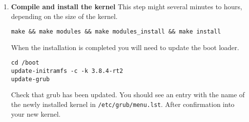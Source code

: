 \begin{enumerate}
\item \textbf{Compile and install the kernel} This step might several minutes to hours, depending on the size of the kernel.
\begin{lstlisting}
make && make modules && make modules_install && make install
\end{lstlisting}
When the installation is completed you will need to update the boot loader.
\begin{lstlisting}
cd /boot
update-initramfs -c -k 3.8.4-rt2
update-grub
\end{lstlisting}
Check that grub has been updated. You should see an entry with the name of the newly installed kernel in \texttt{/etc/grub/menu.lst}. After confirmation  into your new kernel.
\end{enumerate}

